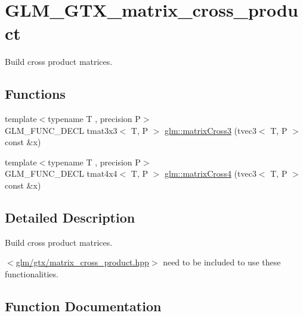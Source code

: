 \hypertarget{group__gtx__matrix__cross__product}{}\section{G\+L\+M\+\_\+\+G\+T\+X\+\_\+matrix\+\_\+cross\+\_\+product}
\label{group__gtx__matrix__cross__product}


Build cross product matrices.  


\subsection*{Functions}
\begin{DoxyCompactItemize}
\item 
{\footnotesize template$<$typename T , precision P$>$ }\\G\+L\+M\+\_\+\+F\+U\+N\+C\+\_\+\+D\+E\+C\+L tmat3x3$<$ T, P $>$ \hyperlink{group__gtx__matrix__cross__product_ga04385b2e3a93c78d116b51af2d8d708e}{glm\+::matrix\+Cross3} (tvec3$<$ T, P $>$ const \&x)
\item 
{\footnotesize template$<$typename T , precision P$>$ }\\G\+L\+M\+\_\+\+F\+U\+N\+C\+\_\+\+D\+E\+C\+L tmat4x4$<$ T, P $>$ \hyperlink{group__gtx__matrix__cross__product_ga2d46cc5253761c214aa5c782865156b1}{glm\+::matrix\+Cross4} (tvec3$<$ T, P $>$ const \&x)
\end{DoxyCompactItemize}


\subsection{Detailed Description}
Build cross product matrices. 

$<$\hyperlink{matrix__cross__product_8hpp}{glm/gtx/matrix\+\_\+cross\+\_\+product.\+hpp}$>$ need to be included to use these functionalities. 

\subsection{Function Documentation}
\hypertarget{group__gtx__matrix__cross__product_ga04385b2e3a93c78d116b51af2d8d708e}{}
